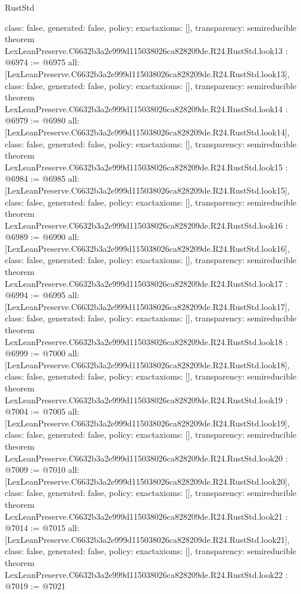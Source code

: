 \begin{lexlean}{RustStd}
\begin{coremodule}
{  class: false,
  generated: false,
  policy: exact{axioms: []},
  transparency: semireducible
}
theorem LexLeanPreserve.C6632b3a2e999d115038026ca828209de.R24.RustStd.look13 : @6974 := @6975 {
  all: [LexLeanPreserve.C6632b3a2e999d115038026ca828209de.R24.RustStd.look13],
  class: false,
  generated: false,
  policy: exact{axioms: []},
  transparency: semireducible
}
theorem LexLeanPreserve.C6632b3a2e999d115038026ca828209de.R24.RustStd.look14 : @6979 := @6980 {
  all: [LexLeanPreserve.C6632b3a2e999d115038026ca828209de.R24.RustStd.look14],
  class: false,
  generated: false,
  policy: exact{axioms: []},
  transparency: semireducible
}
theorem LexLeanPreserve.C6632b3a2e999d115038026ca828209de.R24.RustStd.look15 : @6984 := @6985 {
  all: [LexLeanPreserve.C6632b3a2e999d115038026ca828209de.R24.RustStd.look15],
  class: false,
  generated: false,
  policy: exact{axioms: []},
  transparency: semireducible
}
theorem LexLeanPreserve.C6632b3a2e999d115038026ca828209de.R24.RustStd.look16 : @6989 := @6990 {
  all: [LexLeanPreserve.C6632b3a2e999d115038026ca828209de.R24.RustStd.look16],
  class: false,
  generated: false,
  policy: exact{axioms: []},
  transparency: semireducible
}
theorem LexLeanPreserve.C6632b3a2e999d115038026ca828209de.R24.RustStd.look17 : @6994 := @6995 {
  all: [LexLeanPreserve.C6632b3a2e999d115038026ca828209de.R24.RustStd.look17],
  class: false,
  generated: false,
  policy: exact{axioms: []},
  transparency: semireducible
}
theorem LexLeanPreserve.C6632b3a2e999d115038026ca828209de.R24.RustStd.look18 : @6999 := @7000 {
  all: [LexLeanPreserve.C6632b3a2e999d115038026ca828209de.R24.RustStd.look18],
  class: false,
  generated: false,
  policy: exact{axioms: []},
  transparency: semireducible
}
theorem LexLeanPreserve.C6632b3a2e999d115038026ca828209de.R24.RustStd.look19 : @7004 := @7005 {
  all: [LexLeanPreserve.C6632b3a2e999d115038026ca828209de.R24.RustStd.look19],
  class: false,
  generated: false,
  policy: exact{axioms: []},
  transparency: semireducible
}
theorem LexLeanPreserve.C6632b3a2e999d115038026ca828209de.R24.RustStd.look20 : @7009 := @7010 {
  all: [LexLeanPreserve.C6632b3a2e999d115038026ca828209de.R24.RustStd.look20],
  class: false,
  generated: false,
  policy: exact{axioms: []},
  transparency: semireducible
}
theorem LexLeanPreserve.C6632b3a2e999d115038026ca828209de.R24.RustStd.look21 : @7014 := @7015 {
  all: [LexLeanPreserve.C6632b3a2e999d115038026ca828209de.R24.RustStd.look21],
  class: false,
  generated: false,
  policy: exact{axioms: []},
  transparency: semireducible
}
theorem LexLeanPreserve.C6632b3a2e999d115038026ca828209de.R24.RustStd.look22 : @7019 := @7021 {
}
\end{coremodule}
\end{lexlean}
